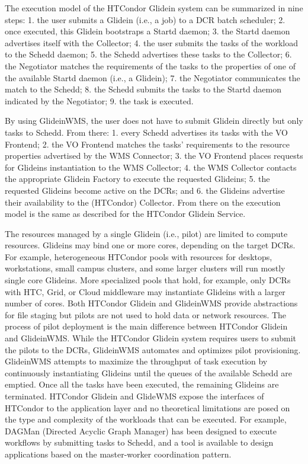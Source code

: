  The execution model of the HTCondor Glidein system can be summarized in nine steps: 1. the user submits a Glidein (i.e., a job) to a DCR batch scheduler; 2. once executed, this Glidein bootstraps a Startd daemon; 3. the Startd daemon advertises itself with the Collector; 4. the user submits the tasks of the workload to the Schedd daemon; 5. the Schedd advertises these tasks to the Collector; 6. the Negotiator matches the requirements of the tasks to the properties of one of the available Startd daemon (i.e., a Glidein); 7. the Negotiator communicates the match to the Schedd; 8. the Schedd submits the tasks to the Startd daemon indicated by
the Negotiator; 9. the task is executed.

By using GlideinWMS, the user does not have to submit Glidein directly but only tasks to Schedd. From there: 1. every Schedd advertises its tasks with the VO Frontend; 2. the VO Frontend matches the tasks’ requirements to the resource properties advertised by the WMS Connector; 3. the VO Frontend places requests for Glideins instantiation to the WMS Collector; 4. the WMS Collector contacts the appropriate Glidein Factory to execute the requested Glideins; 5. the requested Glideins become active on the DCRs; and 6. the Glideins advertise their availability to the (HTCondor) Collector. From there on the execution model is the same as described for the HTCondor Glidein Service.

The resources managed by a single Glidein (i.e., pilot) are limited to compute resources. Glideins may bind one or more cores, depending on the target DCRs. For example, heterogeneous HTCondor pools with resources for desktops, workstations, small campus clusters, and some larger clusters will run mostly single core Glideins. More specialized pools that hold, for example, only DCRs with HTC, Grid, or Cloud middleware may instantiate Glideins with a larger number of cores. Both HTCondor Glidein and GlideinWMS provide abstractions for file staging but pilots are not used to hold data or network resources.
The process of pilot deployment is the main difference between HTCondor Glidein and GlideinWMS. While the
HTCondor Glidein system requires users to submit the pilots to the DCRs, GlideinWMS automates and optimizes pilot provisioning. GlideinWMS attempts to maximize the throughput of task execution by continuously instantiating Glideins until the queues of the available Schedd are emptied. Once all the tasks have been executed, the remaining Glideins are terminated.
HTCondor Glidein and GlideWMS expose the interfaces of HTCondor to the application layer and no theoretical
limitations are posed on the type and complexity of the workloads that can be executed. For example, DAGMan
(Directed Acyclic Graph Manager) has been designed to execute workflows by submitting tasks to Schedd, and a tool is available to design applications based on the master-worker coordination pattern.

